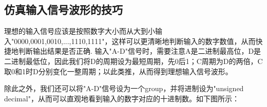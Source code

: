 \documentclass[UTF8]{ctexart}
\begin{document}
\subsection{仿真输入信号波形的技巧}
理想的输入信号应该是按照数字大小而从大到小输入"0000,0001,0010,...,1110,1111"，这样可以更清晰地判断输入的数字数值，从而快捷地判断输出结果是否正确. 输入"A-D"信号时，需要注意A是二进制最高位，D是二进制最低位，因此我们将D的周期设为最短周期，先0后1；C周期为D的两倍，C取0和1时D分别变化一整周期；以此类推，从而得到理想输入信号波形。\par
除此之外，我们还可以将"A-D"信号设为一个group，并将进制设为"unsigned decimal"，从而可以直观地看到输入的数字对应的十进制数。如下图所示：
\begin{figure}[H]
\end{figure}
\end{document}

